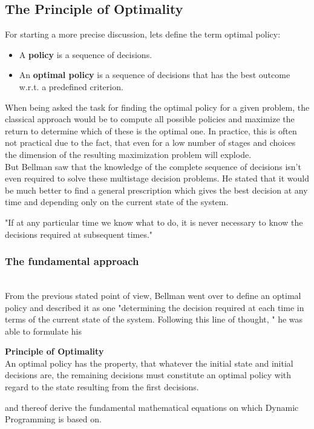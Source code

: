 \documentclass[conference]{IEEEtran}
\begin{document}
\subsection{The Principle of Optimality}
For starting a more precise discussion, lets define the term optimal policy:
\begin{itemize}
\item A \textbf{policy} is a sequence of decisions.
\item An \textbf{optimal policy} is a sequence of decisions that has the best outcome w.r.t. a predefined criterion.
\end{itemize}
When being asked the task for finding the optimal policy for a given problem, the classical approach would be to compute all possible policies and maximize the return to determine which of these is the optimal one. In practice, this is often not practical due to the fact, that even for a low number of stages and choices the dimension of the resulting maximization problem will explode.
\\
But Bellman saw that the knowledge of the complete sequence of decisions isn't even required to solve these multistage decision problems. He stated that it would be much better to find a general prescription which gives the best decision at any time and depending only on the current state of the system.
\begin{center}
"If at any particular time we know what to do, it is never necessary to know the decisions required at subsequent times."
\end{center}
\cite{Bellman.30.07.1954}
\subsubsection{The fundamental approach}
\quad \\
From the previous stated point of view, Bellman went over to define an optimal policy and described it as one "determining the decision required at each time in terms of the current state of the system. Following this line of thought, "\cite{Bellman.30.07.1954} he was able to formulate his 

\begin{center}
\textbf{Principle of Optimality}
\\
An optimal policy has the property, that whatever the initial state and initial decisions are, the remaining decisions must constitute an optimal policy with regard to the state resulting from the first decisions.
\end{center} 
and thereof derive the fundamental mathematical equations on which Dynamic Programming is based on. \cite{Bellman.30.07.1954}
\\
\end{document}
